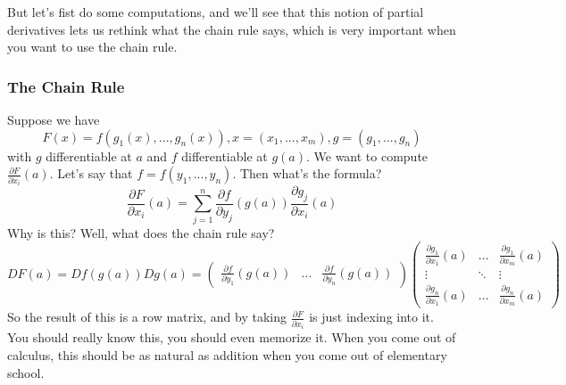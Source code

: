 \documentclass{article}
\newcommand{\prt}[2]{\frac{\partial #1}{\partial #2}}
\begin{document}
But let's fist do some computations, and we'll see that this notion of partial derivatives lets us rethink what the chain rule says, which is very important when you want to use the chain rule.

\subsubsection{The Chain Rule}

Suppose we have
\begin{equation}F(x) =  f(g_1(x),...,g_n(x)), x = (x_1,...,x_m), g = (g_1,...,g_n)\end{equation}
with \(g\) differentiable at \(a\) and \(f\) differentiable at \(g(a)\). We want to compute \(\prt{F}{x_i}(a)\). Let's say that \(f = f(y_1,...,y_n)\). Then what's the formula?
\begin{equation}\prt{F}{x_i}(a) = \sum_{j = 1}^n\prt{f}{y_j}(g(a))\prt{g_j}{x_i}(a)\end{equation}
Why is this? Well, what does the chain rule say?
\begin{equation}DF(a) = Df(g(a))Dg(a) =
\begin{pmatrix} \prt{f}{y_1}(g(a)) & ... & \prt{f}{y_n}(g(a)) \end{pmatrix}
\begin{pmatrix}
  \prt{g_1}{x_1}(a) & ... & \prt{g_1}{x_m}(a) \\
  \vdots & \ddots & \vdots \\
  \prt{g_n}{x_1}(a) & ... & \prt{g_n}{x_m}(a)
\end{pmatrix}
\end{equation}
So the result of this is a row matrix, and by taking \(\prt{F}{x_i}\) is just indexing into it. You should really know this, you should even memorize it. When you come out of calculus, this should be as natural as addition when you come out of elementary school.
\end{document}
